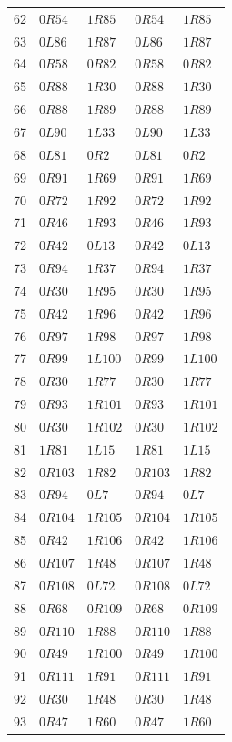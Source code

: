 {\begin{longtable}{@{}rllll@{}}
62 & $0R54$ & $1R85$ & $0R54$ & $1R85$\\
63 & $0L86$ & $1R87$ & $0L86$ & $1R87$\\
64 & $0R58$ & $0R82$ & $0R58$ & $0R82$\\
65 & $0R88$ & $1R30$ & $0R88$ & $1R30$\\
66 & $0R88$ & $1R89$ & $0R88$ & $1R89$\\
67 & $0L90$ & $1L33$ & $0L90$ & $1L33$\\
68 & $0L81$ & $0R2$ & $0L81$ & $0R2$\\
69 & $0R91$ & $1R69$ & $0R91$ & $1R69$\\
70 & $0R72$ & $1R92$ & $0R72$ & $1R92$\\
71 & $0R46$ & $1R93$ & $0R46$ & $1R93$\\
72 & $0R42$ & $0L13$ & $0R42$ & $0L13$\\
73 & $0R94$ & $1R37$ & $0R94$ & $1R37$\\
74 & $0R30$ & $1R95$ & $0R30$ & $1R95$\\
75 & $0R42$ & $1R96$ & $0R42$ & $1R96$\\
76 & $0R97$ & $1R98$ & $0R97$ & $1R98$\\
77 & $0R99$ & $1L100$ & $0R99$ & $1L100$\\
78 & $0R30$ & $1R77$ & $0R30$ & $1R77$\\
79 & $0R93$ & $1R101$ & $0R93$ & $1R101$\\
80 & $0R30$ & $1R102$ & $0R30$ & $1R102$\\
81 & $1R81$ & $1L15$ & $1R81$ & $1L15$\\
82 & $0R103$ & $1R82$ & $0R103$ & $1R82$\\
83 & $0R94$ & $0L7$ & $0R94$ & $0L7$\\
84 & $0R104$ & $1R105$ & $0R104$ & $1R105$\\
85 & $0R42$ & $1R106$ & $0R42$ & $1R106$\\
86 & $0R107$ & $1R48$ & $0R107$ & $1R48$\\
87 & $0R108$ & $0L72$ & $0R108$ & $0L72$\\
88 & $0R68$ & $0R109$ & $0R68$ & $0R109$\\
89 & $0R110$ & $1R88$ & $0R110$ & $1R88$\\
90 & $0R49$ & $1R100$ & $0R49$ & $1R100$\\
91 & $0R111$ & $1R91$ & $0R111$ & $1R91$\\
92 & $0R30$ & $1R48$ & $0R30$ & $1R48$\\
93 & $0R47$ & $1R60$ & $0R47$ & $1R60$\\

\end{longtable}}
